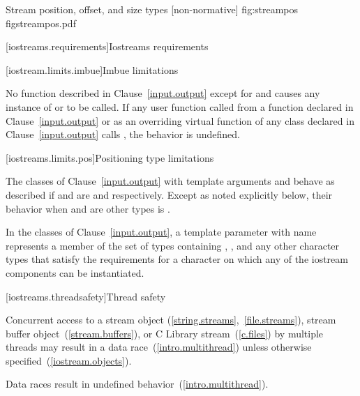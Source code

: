 \begin{importgraphic}
{Stream position, offset, and size types [non-normative]}
{fig:streampos}
{figstreampos.pdf}
\end{importgraphic}

[iostreams.requirements]{Iostreams requirements}

[iostream.limits.imbue]{Imbue limitations}

\pnum
No function described in Clause~\ref{input.output} except for
and 
causes any instance of
or
to be called.
If any user function called from a function declared in Clause~\ref{input.output} or
as an overriding virtual function of any class declared in Clause~\ref{input.output}
calls
,
the behavior is undefined.

[iostreams.limits.pos]{Positioning type limitations}

\pnum
The classes of Clause~\ref{input.output} with template arguments
and
behave as described if
and
are
and
respectively.
Except as noted explicitly below, their behavior when
and
are other types is
%
.

\pnum
In the classes of Clause~\ref{input.output}, a template parameter with name
 represents a member of the set of types containing , ,
and any other 
character types that satisfy the requirements for a character on which any of
the iostream components can be instantiated.

[iostreams.threadsafety]{Thread safety}

\pnum
Concurrent access to a stream object (\ref{string.streams},~\ref{file.streams}), stream buffer
object~(\ref{stream.buffers}), or C Library stream~(\ref{c.files}) by multiple threads may result in
a data race~(\ref{intro.multithread}) unless otherwise specified~(\ref{iostream.objects}).
\begin{note} Data races result in undefined behavior~(\ref{intro.multithread}). \end{note}

